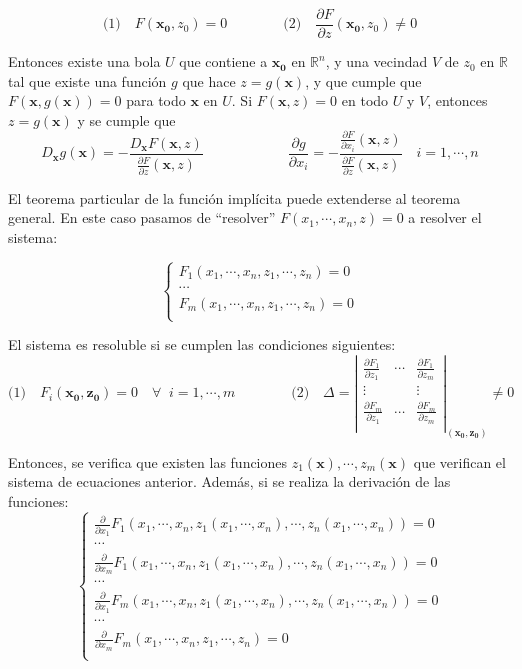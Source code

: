 \documentclass[a4paper]{article}
\begin{document}
\[ \text{(1)} \quad F(\textbf{x}_\textbf{0}, z_0) = 0 \qquad\qquad \text{(2)} \quad \frac{\partial F}{\partial z} (\textbf{x}_\textbf{0}, z_0) \neq 0 \]

Entonces existe una bola $U$ que contiene a  $\textbf{x}_\textbf{0}$ en $\mathbb{R}^n$, y una vecindad $V$ de $z_0$ en $\mathbb{R}$ tal que existe una función $g$ que hace $z = g(\textbf{x})$, y que cumple que $F(\textbf{x}, g(\textbf{x})) = 0$ para todo $\textbf{x}$ en $U$. Si $F(\textbf{x}, z) = 0$ en todo $U$ y $V$, entonces $z = g(\textbf{x})$ y se cumple que
\[ D_\textbf{x}g(\textbf{x}) = - \frac{D_\textbf{x}F(\textbf{x}, z)}{\frac{\partial F}{\partial z} (\textbf{x}, z)} \qquad\qquad\qquad \frac{\partial g}{\partial x_i} = -\frac{\frac{\partial F}{\partial x_i} (\textbf{x}, z)}{\frac{\partial F}{\partial z} (\textbf{x}, z)} \quad i = 1, \cdots, n\]

El teorema particular de la función implícita puede extenderse al teorema general. En este caso pasamos de ``resolver'' $F(x_1, \cdots, x_n, z) = 0$ a resolver el sistema:

\[\begin{cases}
F_1(x_1, \cdots, x_n, z_1, \cdots, z_n) = 0\\
\cdots \\
F_m(x_1, \cdots, x_n, z_1, \cdots, z_n) = 0\\
\end{cases}  \]

El sistema es resoluble si se cumplen las condiciones siguientes:
\[ \text{(1)} \quad F_i(\textbf{x}_\textbf{0}, \textbf{z}_\textbf{0}) = 0 \quad \forall \;\; i = 1,\cdots, m\qquad\qquad \text{(2)} \quad \Delta =  \left|\begin{matrix}
\frac{\partial F_1}{\partial z_1} & \cdots & \frac{\partial F_1}{\partial z_m}\\
 \vdots & & \vdots \\
 \frac{\partial F_m}{\partial z_1} & \cdots & \frac{\partial F_m}{\partial z_m}\\
\end{matrix} \right|_{(\textbf{x}_\textbf{0}, \textbf{z}_\textbf{0})}  \neq 0 \]

Entonces, se verifica que existen las funciones $z_1(\textbf{x}), \cdots, z_m(\textbf{x})$
que verifican el sistema de ecuaciones anterior. Además, si se realiza la derivación de las funciones:
\[\begin{cases}
\frac{\partial}{\partial x_1}F_1(x_1, \cdots, x_n, z_1(x_1, \cdots, x_n), \cdots, z_n(x_1, \cdots, x_n)) = 0\\
\cdots \\
\frac{\partial}{\partial x_m}F_1(x_1, \cdots, x_n, z_1(x_1, \cdots, x_n), \cdots, z_n(x_1, \cdots, x_n)) = 0\\
\cdots \\
\frac{\partial}{\partial x_1}F_m(x_1, \cdots, x_n, z_1(x_1, \cdots, x_n), \cdots, z_n(x_1, \cdots, x_n)) = 0\\
\cdots \\
\frac{\partial}{\partial x_m}F_m(x_1, \cdots, x_n, z_1, \cdots, z_n) = 0\\
\end{cases} 
\]
\end{document}
